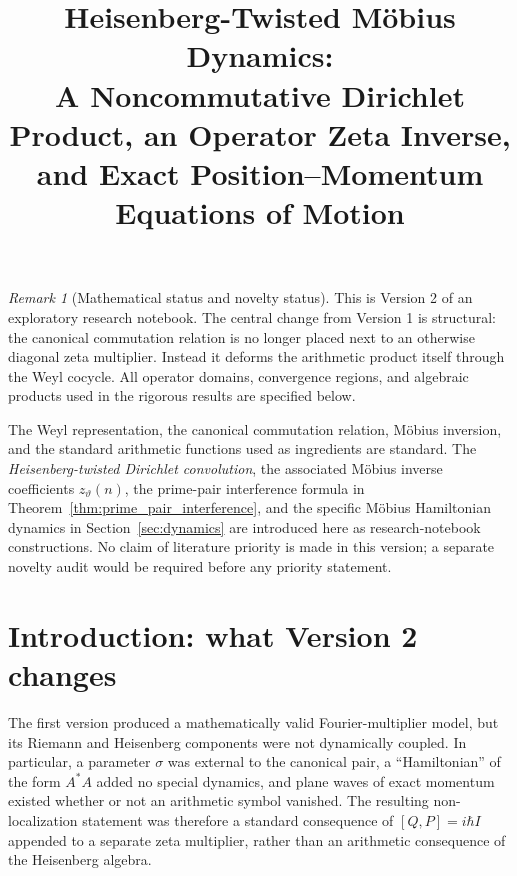 \documentclass[11pt]{amsart}
\title[Heisenberg-Twisted M\"obius Dynamics]{
Heisenberg-Twisted M\"obius Dynamics:\\
A Noncommutative Dirichlet Product, an Operator Zeta Inverse,\\
and Exact Position--Momentum Equations of Motion
}
\author{}
\date{}
\numberwithin{equation}{section}
\theoremstyle{plain}
\theoremstyle{definition}
\theoremstyle{remark}
\newtheorem{remark}[theorem]{Remark}
\begin{document}
\maketitle

\tableofcontents

\bigskip

\begin{remark}[Mathematical status and novelty status]
\label{rem:status}
This is Version 2 of an exploratory research notebook.  The central change
from Version 1 is structural: the canonical commutation relation is no longer
placed next to an otherwise diagonal zeta multiplier.  Instead it deforms the
arithmetic product itself through the Weyl cocycle.  All operator domains,
convergence regions, and algebraic products used in the rigorous results are
specified below.

The Weyl representation, the canonical commutation relation, M\"obius
inversion, and the standard arithmetic functions used as ingredients are
standard.  The \emph{Heisenberg-twisted Dirichlet convolution}, the associated
M\"obius inverse coefficients $z_{\vartheta}(n)$, the prime-pair interference
formula in Theorem~\ref{thm:prime_pair_interference}, and the specific
M\"obius Hamiltonian dynamics in Section~\ref{sec:dynamics} are introduced
here as research-notebook constructions.  No claim of literature priority is
made in this version; a separate novelty audit would be required before any
priority statement.
\end{remark}

\section{Introduction: what Version 2 changes}
\label{sec:introduction}

The first version produced a mathematically valid Fourier-multiplier model,
but its Riemann and Heisenberg components were not dynamically coupled.  In
particular, a parameter $\sigma$ was external to the canonical pair, a
``Hamiltonian'' of the form $A^*A$ added no special dynamics, and plane waves
of exact momentum existed whether or not an arithmetic symbol vanished.  The
resulting non-localization statement was therefore a standard consequence of
$[Q,P]=i\hbar I$ appended to a separate zeta multiplier, rather than an
arithmetic consequence of the Heisenberg algebra.
\end{document}
